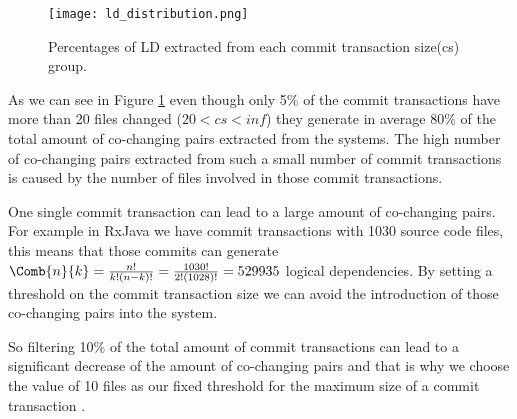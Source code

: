 \begin{figure}[!h]
\centering
\texttt{[image: ld\_distribution.png]}
\caption{Percentages of LD extracted from each commit transaction size(cs) group.}
\label{fig:fig_ld_cs}
\centering
\end{figure}

As we can see in Figure \ref{fig:fig_ld_cs} even though only 5\% of the commit transactions have more than 20 files changed ($20<cs<inf$) they generate in average 80\% of the total amount of co-changing pairs extracted from the systems.
The high number of co-changing pairs extracted from such a small number of commit transactions is caused by the number of files involved in those commit transactions. 

One single commit transaction can lead to a large amount of co-changing pairs. For example in RxJava we have commit transactions with 1030 source code files, this means that those commits can generate 
$\Comb{n}{k}=\frac{n!}{k!(n-k)!} = \frac{1030!}{2!(1028)!} = 529 935$ logical dependencies. By setting a threshold on the commit transaction size we can avoid the introduction of those co-changing pairs into the system.



So filtering 10\% of the total amount of commit transactions can lead to a significant decrease of the amount of co-changing pairs and that is why we choose the value of 10 files as our fixed threshold for the maximum size of a commit transaction \cite{DepSACI}.



